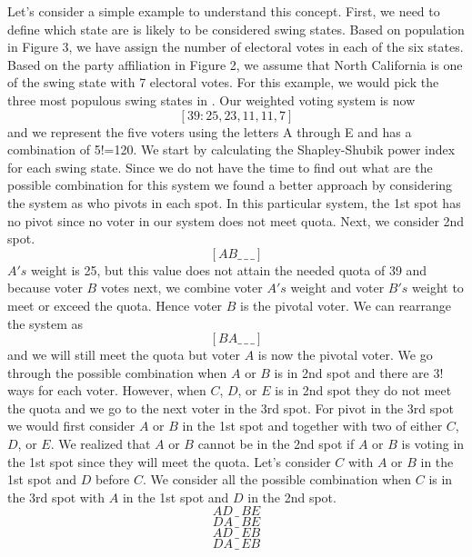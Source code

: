 \documentclass[12pt]{article}
\begin{document}
\noindent Let's consider a simple example to understand this concept. First, we need to define which state are is likely to be considered swing states. Based on population in Figure 3, we have assign the number of electoral votes in each of the six states. Based on the party affiliation in Figure 2, we assume that North California is one of the swing state with 7 electoral votes. For this example, we would pick the three most populous swing states in \cite{C}. Our weighted voting system is now $$[39:25,23,11,11,7]$$ and we represent the five voters using the letters A through E and has a combination of 5!=120. We start by calculating the Shapley-Shubik power index for each swing state. 
Since we do not have the time to find out what are the possible combination for this system we found a better approach by considering the system as who pivots in each spot. In this particular system, the 1st spot has no pivot since no voter in our system does not meet quota. Next, we consider 2nd spot. $$[A B \_ \,\_\, \_] $$ $A's$ weight is 25, but this value does not attain the needed quota of 39 and because voter $B$ votes next, we combine voter $A's$ weight and voter $B's$ weight to meet or exceed the quota. Hence voter $B$ is the pivotal voter. We can rearrange the system as $$[B A \_ \,\_\, \_] $$ and we will still meet the quota but voter $A$ is now the pivotal voter. We go through the possible combination when $A$ or $B$ is in 2nd spot and there are 3! ways for each voter. However, when $C$, $D$, or $E$ is in 2nd spot they do not meet the quota and we go to the next voter in the 3rd spot. For pivot in the 3rd spot we would first consider $A$ or $B$ in the 1st spot and together with two of either $C$, $D$, or $E$. We realized that $A$ or $B$ cannot be in the 2nd spot if $A$ or $B$ is voting in the 1st spot since they will meet the quota. Let's consider $C$ with $A$ or $B$ in the 1st spot and $D$ before $C$. We consider all the possible combination when $C$ is in the 3rd spot with $A$ in the 1st spot and $D$ in the 2nd spot. 
$${AD\,\_ \,BE}$$
$${DA\,\_ \,BE}$$
$${AD\,\_ \,EB}$$
$${DA\,\_ \,EB}$$ 
\end{document}
